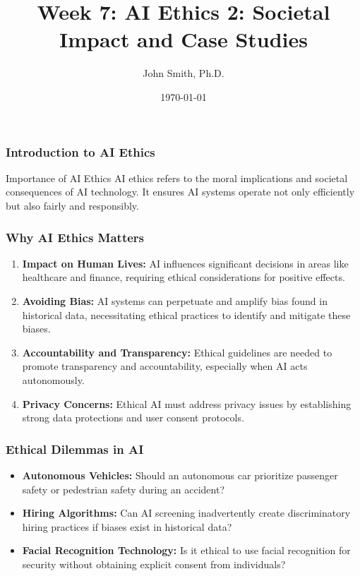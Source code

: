 \documentclass[aspectratio=169]{beamer}
\title[Week 7: AI Ethics 2]{Week 7: AI Ethics 2: Societal Impact and Case Studies}
\author[J. Smith]{John Smith, Ph.D.}
\institute[University Name]{
  Department of Computer Science\\
  University Name\\
  \vspace{0.3cm}
  Email: email@university.edu\\
  Website: www.university.edu
}
\date{\today}
\begin{document}
\frame{\titlepage}

\begin{frame}[fragile]
    \frametitle{Introduction to AI Ethics}
    \begin{block}{Importance of AI Ethics}
        AI ethics refers to the moral implications and societal consequences of AI technology.
        It ensures AI systems operate not only efficiently but also fairly and responsibly.
    \end{block}
\end{frame}

\begin{frame}[fragile]
    \frametitle{Why AI Ethics Matters}
    \begin{enumerate}
        \item \textbf{Impact on Human Lives:} 
        AI influences significant decisions in areas like healthcare and finance, requiring ethical considerations for positive effects.
        
        \item \textbf{Avoiding Bias:} 
        AI systems can perpetuate and amplify bias found in historical data, necessitating ethical practices to identify and mitigate these biases.
        
        \item \textbf{Accountability and Transparency:} 
        Ethical guidelines are needed to promote transparency and accountability, especially when AI acts autonomously.
        
        \item \textbf{Privacy Concerns:} 
        Ethical AI must address privacy issues by establishing strong data protections and user consent protocols.
    \end{enumerate}
\end{frame}

\begin{frame}[fragile]
    \frametitle{Ethical Dilemmas in AI}
    \begin{itemize}
        \item \textbf{Autonomous Vehicles:} Should an autonomous car prioritize passenger safety or pedestrian safety during an accident?
        
        \item \textbf{Hiring Algorithms:} Can AI screening inadvertently create discriminatory hiring practices if biases exist in historical data?
        
        \item \textbf{Facial Recognition Technology:} Is it ethical to use facial recognition for security without obtaining explicit consent from individuals?
    \end{itemize}
\end{frame}
\end{document}
